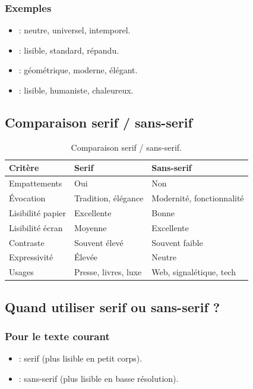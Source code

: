 \subsubsection{Exemples}

\begin{itemize}
    \item {} : neutre, universel, intemporel.
    \item {} : lisible, standard, répandu.
    \item {} : géométrique, moderne, élégant.
    \item {} : lisible, humaniste, chaleureux.
\end{itemize}

\subsection{Comparaison serif / sans-serif}

\begin{table}[h!]
\centering
\begin{tabular}{@{}lll@{}}
\toprule
\textbf{Critère} & \textbf{Serif} & \textbf{Sans-serif} \\
\midrule
Empattements & Oui & Non \\
Évocation & Tradition, élégance & Modernité, fonctionnalité \\
Lisibilité papier & Excellente & Bonne \\
Lisibilité écran & Moyenne & Excellente \\
Contraste & Souvent élevé & Souvent faible \\
Expressivité & Élevée & Neutre \\
Usages & Presse, livres, luxe & Web, signalétique, tech \\
\bottomrule
\end{tabular}
\caption{Comparaison serif / sans-serif.}
\end{table}

\subsection{Quand utiliser serif ou sans-serif ?}

\subsubsection{Pour le texte courant}

\begin{itemize}
    \item {} : serif (plus lisible en petit corps).
    \item {} : sans-serif (plus lisible en basse résolution).
\end{itemize}

